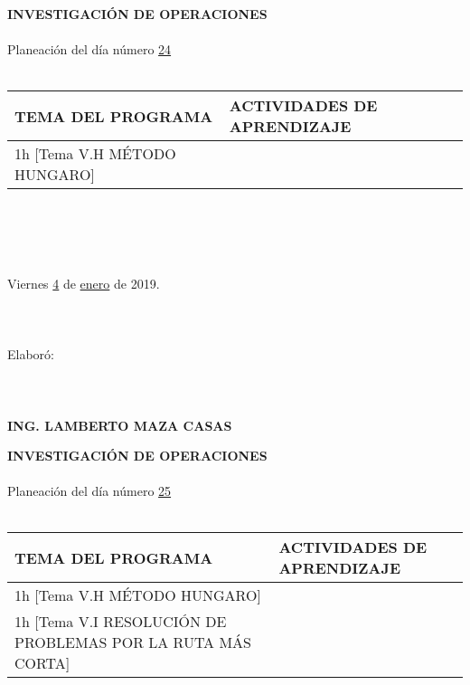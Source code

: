 \documentclass[landscape]{article}
\begin{document}
{\large
\begin{center}
{\bf 
INVESTIGACI\'ON DE OPERACIONES
}
\ \\
\ \\
Planeaci\'on del d\'ia n\'umero \underline{\hspace{0.5cm}24\hspace{0.5cm}}
\ \\
\ \\
\begin{tabular}{|p{11cm}|p{8cm}|}\hline
{\bf TEMA DEL PROGRAMA}&{\bf ACTIVIDADES DE APRENDIZAJE}\\\hline
	1h	[Tema V.H M\'ETODO HUNGARO]
&\\
\hline
\end{tabular}
\ \\
\ \\
\ \\
\ \\
Viernes \underline{\hspace{0.5cm}4\hspace{0.5cm}} de  \underline{\hspace{0.5cm}enero\hspace{0.5cm}} de 2019.
\ \\
\ \\
\ \\
\ \\
Elabor\'o:
\ \\
\ \\
\ \\
\ \\
{\bf ING. LAMBERTO MAZA CASAS}
\end{center}
\eject
\begin{center}
{\bf 
INVESTIGACI\'ON DE OPERACIONES
}
\ \\
\ \\
Planeaci\'on del d\'ia n\'umero \underline{\hspace{0.5cm}25\hspace{0.5cm}}
\ \\
\ \\
\begin{tabular}{|p{11cm}|p{8cm}|}\hline
{\bf TEMA DEL PROGRAMA}&{\bf ACTIVIDADES DE APRENDIZAJE}\\\hline
	1h	[Tema V.H M\'ETODO HUNGARO]
&\\
	1h	[Tema V.I RESOLUCI\'ON DE PROBLEMAS POR LA RUTA M\'AS CORTA]
&\\
\hline
\end{tabular}
\ \\
\ \\

\end{center}}
\end{document}
